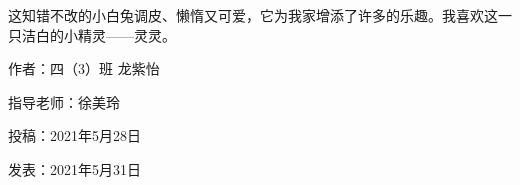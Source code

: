 这知错不改的小白兔调皮、懒惰又可爱，它为我家增添了许多的乐趣。我喜欢这一只洁白的小精灵——灵灵。





\vspace{10pt}



作者：四（3）班 龙紫怡



指导老师：徐美玲



投稿：2021年5月28日



发表：2021年5月31日




                



\vspace{10pt}

\hline



